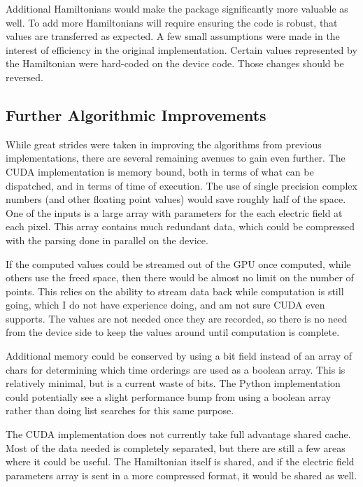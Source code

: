\documentclass[fontsize=11pt]{scrartcl}
\numberwithin{equation}{section}		%
\numberwithin{figure}{section}			%
\numberwithin{table}{section}				%
\begin{document}
Additional Hamiltonians would make the package significantly more valuable as well.
To add more Hamiltonians will require ensuring the code is robust, that values are transferred as expected.
A few small assumptions were made in the interest of efficiency in the original implementation.
Certain values represented by the Hamiltonian were hard-coded on the device code.
Those changes should be reversed.

\subsection{Further Algorithmic Improvements}

While great strides were taken in improving the algorithms from previous implementations, there are several remaining avenues to gain even further.
The CUDA implementation is memory bound, both in terms of what can be dispatched, and in terms of time of execution.
The use of single precision complex numbers (and other floating point values) would save roughly half of the space.
One of the inputs is a large array with parameters for the each electric field at each pixel.
This array contains much redundant data, which could be compressed with the parsing done in parallel on the device.

If the computed values could be streamed out of the GPU once computed, while others use the freed space, then there would be almost no limit on the number of points.
This relies on the ability to stream data back while computation is still going, which I do not have experience doing, and am not sure CUDA even supports.
The values are not needed once they are recorded, so there is no need from the device side to keep the values around until computation is complete.

Additional memory could be conserved by using a bit field instead of an array of chars for determining which time orderings are used as a boolean array.
This is relatively minimal, but is a current waste of bits.
The Python implementation could potentially see a slight performance bump from using a boolean array rather than doing list searches for this same purpose.

The CUDA implementation does not currently take full advantage shared cache.
Most of the data needed is completely separated, but there are still a few areas where it could be useful.
The Hamiltonian itself is shared, and if the electric field parameters array is sent in a more compressed format, it would be shared as well.
\end{document}
